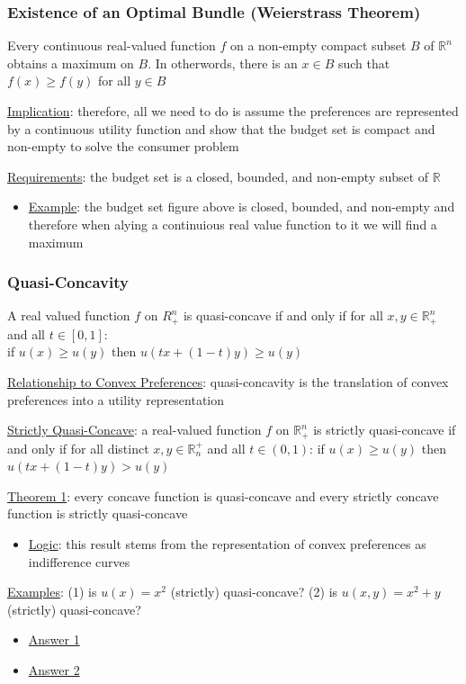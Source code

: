 \documentclass{article}
\begin{document}
\subsubsection{Existence of an Optimal Bundle (Weierstrass Theorem)}
Every continuous real-valued function $f$ on a non-empty compact subset $B$ of $\mathbb{R}^{n}$ obtains a maximum on $B$. In otherwords, there is an $x \in B$ such that $f(x) \geq f(y)$ for all $y \in B$ \par \vspace{0.3em}
  \underline{Implication}: therefore, all we need to do is assume the preferences are represented by a continuous utility function and show that the budget set is compact and non-empty to solve the consumer problem \par
  \underline{Requirements}: the budget set is a closed, bounded, and non-empty subset of $\mathbb{R}$
  \begin{itemize}
    \item  \underline{Example}: the budget set figure above is closed, bounded, and non-empty and therefore when alying a continuious real value function to it we will find a maximum
  \end{itemize}
\vspace{6mm}
\subsubsection{Quasi-Concavity}
A real valued function $f$ on $R_{+}^{n}$ is quasi-concave if and only if for all $x, y \in \mathbb{R}_{+}^{n}$ and all $t \in [0,1]$: \\ if $u(x) \geq u(y)$ then $u(tx + (1-t)y) \geq u(y)$ \par \vspace{0.3em}
  \underline{Relationship to Convex Preferences}: quasi-concavity is the translation of convex preferences into a utility representation \par
  \underline{Strictly Quasi-Concave}: a real-valued function $f$ on $\mathbb{R}_{+}^{n}$ is strictly quasi-concave if and only if for all distinct $x, y \in \mathbb{R}^{+}_{n}$ and all $t \in (0,1)$: if $u(x) \geq u(y)$ then $u(tx + (1-t)y) > u(y)$
  \par
  \underline{Theorem 1}: every concave function is quasi-concave and every strictly concave function is strictly quasi-concave
  \begin{itemize}
    \item  \underline{Logic}: this result stems from the representation of convex preferences as indifference curves
  \end{itemize}
  \par
  \underline{Examples}: (1) is $u(x) = x^{2}$ (strictly) quasi-concave? (2) is $u(x,y) = x^{2} + y$ (strictly) quasi-concave?
  \begin{itemize}
    \item  \underline{Answer 1}
    \item  \underline{Answer 2}
  \end{itemize}
  \par
\vspace{6mm}
\end{document}
